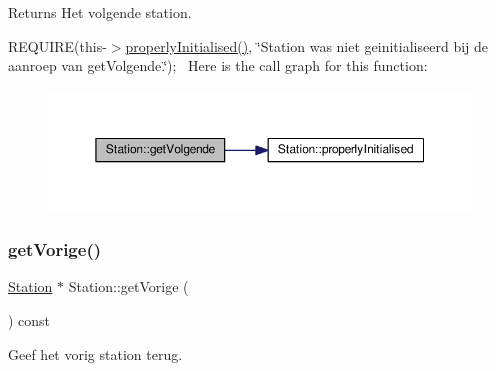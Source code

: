 \begin{DoxyReturn}{Returns}
Het volgende station.
\end{DoxyReturn}
R\+E\+Q\+U\+I\+RE(this-\/$>$\hyperlink{class_station_a9ce626dd0599e3ea8107404a59c21e16}{properly\+Initialised()}, \char`\"{}\+Station was niet geinitialiseerd bij de aanroep van get\+Volgende.\char`\"{});~\newline
Here is the call graph for this function\+:
\nopagebreak
\begin{figure}[H]
\begin{center}
\leavevmode
\includegraphics[width=350pt]{class_station_a330c297adddcbfd5d8871075291e9512_cgraph}
\end{center}
\end{figure}
\mbox{\label{class_station_a69c0539e899ff540c38eb434a69bfa9e}} 
\subsubsection{\texorpdfstring{get\+Vorige()}{getVorige()}}
{\footnotesize\ttfamily \hyperlink{class_station}{Station} $\ast$ Station\+::get\+Vorige (\begin{DoxyParamCaption}{ }\end{DoxyParamCaption}) const}



Geef het vorig station terug. 

